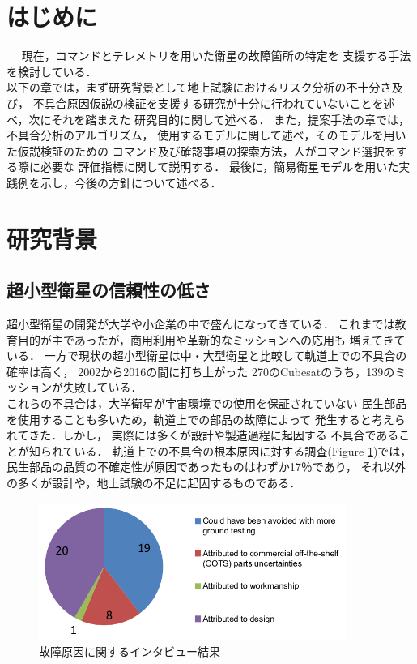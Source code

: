 \documentclass[11pt]{report}
\begin{document}
\fi

\section{はじめに}
現在，コマンドとテレメトリを用いた衛星の故障箇所の特定を
支援する手法を検討している．\\
以下の章では，まず研究背景として地上試験におけるリスク分析の不十分さ及び，
不具合原因仮説の検証を支援する研究が十分に行われていないことを述べ，次にそれを踏まえた
研究目的に関して述べる．
また，提案手法の章では，不具合分析のアルゴリズム，
使用するモデルに関して述べ，そのモデルを用いた仮説検証のための
コマンド及び確認事項の探索方法，人がコマンド選択をする際に必要な
評価指標に関して説明する．
最後に，簡易衛星モデルを用いた実践例を示し，今後の方針について述べる．

\section{研究背景} 
\subsection{超小型衛星の信頼性の低さ}

超小型衛星の開発が大学や小企業の中で盛んになってきている．
これまでは教育目的が主であったが，商用利用や革新的なミッションへの応用も
増えてきている\cite{Langer2016}．
一方で現状の超小型衛星は中・大型衛星と比較して軌道上での不具合の確率は高く，
2002から2016の間に打ち上がった
270のCubesatのうち，139のミッションが失敗している\cite{Langer2016}．\\
これらの不具合は，大学衛星が宇宙環境での使用を保証されていない
民生部品を使用することも多いため，軌道上での部品の故障によって
発生すると考えられてきた．しかし，
実際には多くが設計や製造過程に起因する
不具合であることが知られている\cite{Venturini2017}．
軌道上での不具合の根本原因に対する調査(Figure \ref{fig:cause of failure})では，
民生部品の品質の不確定性が原因であったものはわずか17％であり，
それ以外の多くが設計や，地上試験の不足に起因するものである\cite{Venturini2017}．

\begin{figure}[H]
   \centering
      \includegraphics[height=4.5cm]{figure/cause_of_failure.png}
      \caption{故障原因に関するインタビュー結果\cite{Venturini2017}}
      \label{fig:cause of failure}
\end{figure}
\end{document}
